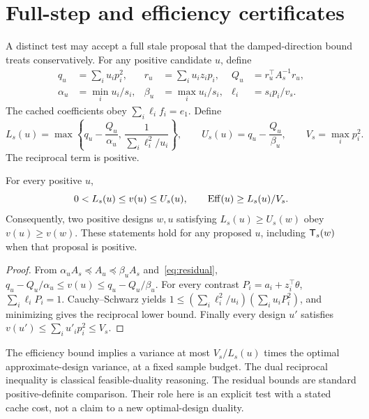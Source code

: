 \documentclass[11pt]{article}
\begin{document}
\section{Full-step and efficiency certificates}
A distinct test may accept a full stale proposal that the damped-direction bound treats conservatively.
For any positive candidate $u$, define
\begin{align}
 q_u&=\sum_i u_i p_i^2,& r_u&=\sum_i u_i z_i p_i,&
 Q_u&=r_u^\top A_s^{-1}r_u,\\
 \alpha_u&=\min_i u_i/s_i,&\beta_u&=\max_i u_i/s_i,&
 \ell_i&=s_ip_i/v_s.
\end{align}
The cached coefficients obey $\sum_i\ell_i f_i=e_1$.
Define
\begin{equation}\label{eq:LU}
 L_s(u)=\max\left\{q_u-\frac{Q_u}{\alpha_u},\,
          \frac1{\sum_i\ell_i^2/u_i}\right\},\qquad
 U_s(u)=q_u-\frac{Q_u}{\beta_u},\qquad V_s=\max_i p_i^2.
\end{equation}
The reciprocal term is positive.

\begin{theorem}\label{thm:interval}
For every positive $u$,
\begin{equation}\label{eq:interval}
 0<L_s(u)\le v(u)\le U_s(u),\qquad
 \operatorname{Eff}(u)\ge L_s(u)/V_s.
\end{equation}
Consequently, two positive designs $w,u$ satisfying
$L_s(u)\ge U_s(w)$ obey $v(u)\ge v(w)$.
These statements hold for any proposed $u$, including $\mathsf T_s(w)$ when that proposal is positive.
\end{theorem}
\begin{proof}
From $\alpha_u A_s\preceq A_u\preceq\beta_u A_s$ and~\eqref{eq:residual},
$q_u-Q_u/\alpha_u\le v(u)\le q_u-Q_u/\beta_u$.
For every contrast $P_i=a_i+z_i^\top\theta$,
$\sum_i\ell_i P_i=1$.
Cauchy--Schwarz yields
$1\le(\sum_i\ell_i^2/u_i)(\sum_i u_iP_i^2)$, and minimizing gives the reciprocal lower bound.
Finally every design $u'$ satisfies
$v(u')\le\sum_i u'_i p_i^2\le V_s$.
\end{proof}
The efficiency bound implies a variance at most $V_s/L_s(u)$ times the optimal approximate-design variance, at a fixed sample budget.
The dual reciprocal inequality is classical feasible-duality reasoning.
The residual bounds are standard positive-definite comparison.
Their role here is an explicit test with a stated cache cost, not a claim to a new optimal-design duality.
\end{document}
